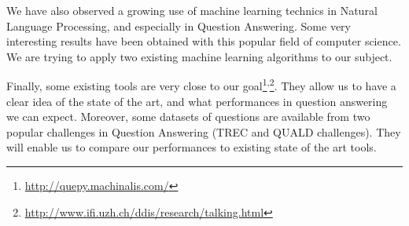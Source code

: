 We have also observed a growing use of machine learning technics in Natural Language Processing, and especially in Question Answering. Some very interesting results have been obtained with this popular field of computer science. We are trying to apply two existing machine learning algorithms to our subject.

Finally, some existing tools are very close to our goal\footnote{\url{http://quepy.machinalis.com/}}\textsuperscript{,}\footnote{\url{http://www.ifi.uzh.ch/ddis/research/talking.html}}. They allow us to have a clear idea of the state of the art, and what performances in question answering we can expect. Moreover,  some datasets of questions are available from two popular challenges in Question Answering (TREC and QUALD challenges). They will enable us to compare our performances to existing state of the art tools.
